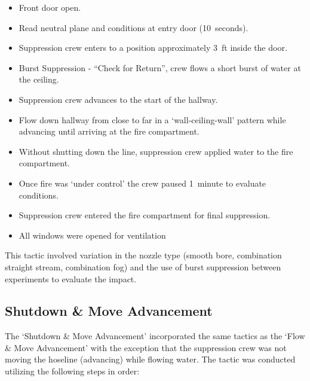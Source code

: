 \documentclass[12pt,oneside]{book}
\begin{document}
\begin{itemize}
	\item{Front door open.}
	\item{Read neutral plane and conditions at entry door (10~seconds).}
	\item{Suppression crew enters to a position approximately 3~ft inside the door.}
	\item{Burst Suppression - ``Check for Return'', crew flows a short burst of water at the ceiling.}
	\item{Suppression crew advances to the start of the hallway.}
	\item{Flow down hallway from close to far in a `wall-ceiling-wall' pattern while advancing until arriving at the fire compartment.}
	\item{Without shutting down the line, suppression crew applied water to the fire compartment.}
	\item{Once fire was `under control' the crew paused 1~minute to evaluate conditions.}
	\item{Suppression crew entered the fire compartment for final suppression.}
	\item{All windows were opened for ventilation}
\end{itemize}

This tactic involved variation in the nozzle type (smooth bore, combination straight stream, combination fog) and the use of burst suppression between experiments to evaluate the impact.

\subsection{Shutdown \& Move Advancement}
The `Shutdown \& Move Advancement' incorporated the same tactics as the `Flow \& Move Advancement' with the exception that the suppression crew was not moving the hoseline (advancing) while flowing water. The tactic was conducted utilizing the following steps in order:
\end{document}
